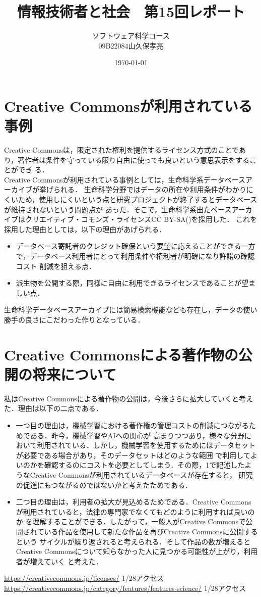 \documentclass[dvipdfmx]{jarticle}
\title{情報技術者と社会　第15回レポート}
\author{ソフトウェア科学コース\\09B22084山久保孝亮}
\date{\today}
\begin{document}
\maketitle
\section{Creative Commonsが利用されている事例}
Creative Commonsは，限定された権利を提供するライセンス方式のことであり，著作者は条件を守っている限り自由に使っても良いという意思表示をすることができ
る．\cite{0}\\
Creative Commonsが利用されている事例としては，生命科学系データベースアーカイブが挙げられる．\cite{1}
生命科学分野ではデータの所在や利用条件がわかりにくいため，使用しにくいという点と研究プロジェクトが終了するとデータベースが維持されないという問題点が
あった．そこで，生命科学系出たベースアーカイブはクリエイティブ・コモンズ・ライセンスCC BY-SA()を採用した．
これを採用した理由としては，以下の理由があげられる．
\begin{itemize}
  \item データベース寄託者のクレジット確保という要望に応えることができる一方で，データベース利用者にとって利用条件や権利者が明確になり許諾の確認コスト
  削減を狙える点．
  \item 派生物を公開する際，同様に自由に利用できるライセンスであることが望ましい点．
\end{itemize}
生命科学データベースアーカイブには簡易検索機能なども存在し，データの使い勝手の良さにこだわった作りとなっている．
\section{Creative Commonsによる著作物の公開の将来について}
私はCreative Commonsによる著作物の公開は，今後さらに拡大していくと考えた．理由は以下の二点である．
\begin{itemize}
  \item 一つ目の理由は，機械学習における著作権の管理コストの削減につながるためである．昨今，機械学習やAIへの関心が
  高まりつつあり，様々な分野において利用されている．しかし，機械学習を使用するためにはデータセットが必要である場合があり，そのデータセットはどのような範囲
  で利用してよいのかを確認するのにコストを必要としてしまう．その際，1で記述したようなCreative Commonsが利用されているデータベースが存在すると，
  研究の促進にもつながるのではないかと考えたためである．
  \item 二つ目の理由は，利用者の拡大が見込めるためである．Creative Commonsが利用されていると，法律の専門家でなくてもどのように利用すれば良いのか
  を理解することができる．したがって，一般人がCreative Commonsで公開されている作品を使用して新たな作品を再びCreative Commonsに公開するという
  サイクルが繰り返されると考えられる．そして作品の数が増えるとCreative Commonsについて知らなかった人に見つかる可能性が上がり，利用者が増えていく
  と考えた．
\end{itemize}
\begin{thebibliography}{99}
   \url{https://creativecommons.jp/licenses/} 1/28アクセス
   \url{https://creativecommons.jp/category/features/features-science/} 1/28アクセス
\end{thebibliography}
\end{document}
